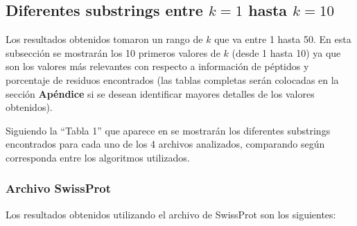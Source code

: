 \subsection{Diferentes substrings entre $k = 1$ hasta $k = 10$}

Los resultados obtenidos tomaron un rango de $k$ que va entre 1 hasta 50. En esta subsección se mostrarán los 10 primeros valores de $k$ (desde 1 hasta 10) ya que son los valores más relevantes con respecto a información de péptidos y porcentaje de residuos encontrados (las tablas completas serán colocadas en la sección \textbf{Apéndice} si se desean identificar mayores detalles de los valores obtenidos).

Siguiendo la ``Tabla 1'' que aparece en \cite{searching} se mostrarán los diferentes substrings encontrados para cada uno de los 4 archivos analizados, comparando según corresponda entre los algoritmos utilizados.

\subsubsection{Archivo SwissProt}

Los resultados obtenidos utilizando el archivo de SwissProt son los siguientes:

